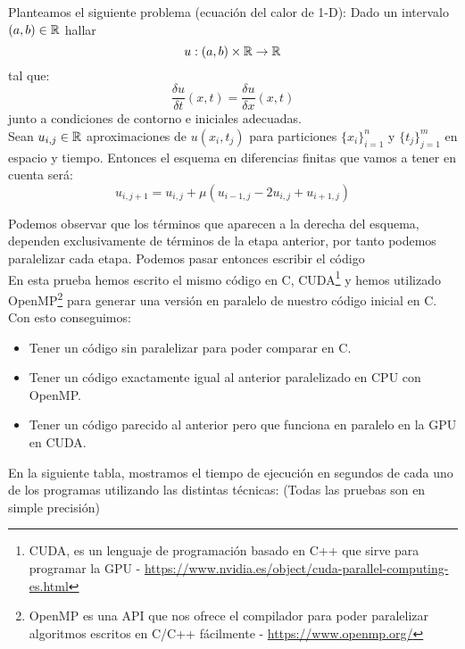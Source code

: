\begin{ejemplo}
  Planteamos el siguiente problema (ecuación del calor de 1-D): 
  Dado un intervalo $(a, b) \in \mathbb R$ hallar $$u : (a, b) \times \mathbb R \rightarrow \mathbb R$$ tal que:
  $$
	  \frac{\delta u}{\delta t} (x, t) = \frac{\delta u}{\delta x} (x, t)
  $$
  junto a condiciones de contorno e iniciales adecuadas. \\
  Sean $u_{i, j} \in \mathbb R$ aproximaciones de $u(x_i, t_j)$ para particiones $\{x_i\}^n_{i=1}$ y $\{t_j\}_{j=1}^m$ en espacio y tiempo. Entonces el esquema en diferencias finitas que vamos a tener en cuenta será:
  \[
  u_{i, j+1} = u_{i, j} + \mu (u_{i-1, j} - 2 u_{i, j} + u_{i+1, j})
  \]
  
  Podemos observar que los términos que aparecen a la derecha del esquema, dependen exclusivamente de términos de la etapa anterior, por tanto podemos paralelizar cada etapa. Podemos pasar entonces escribir el código\\
  
  En esta prueba hemos escrito el mismo código en C, CUDA\footnote{CUDA, es un lenguaje de programación basado en C++ que sirve para programar la GPU - \href{https://www.nvidia.es/object/cuda-parallel-computing-es.html}{https://www.nvidia.es/object/cuda-parallel-computing-es.html}} y hemos utilizado OpenMP\footnote{OpenMP es una API que nos ofrece el compilador para poder paralelizar algoritmos escritos en C/C++ fácilmente -  \href{https://www.openmp.org/}{https://www.openmp.org/}} para generar una versión en paralelo de nuestro código inicial en C. Con esto conseguimos:
  \begin{itemize}
  \item Tener un código sin paralelizar para poder comparar en C.
  \item Tener un código exactamente igual al anterior paralelizado en CPU con OpenMP.
  \item Tener un código parecido al anterior pero que funciona en paralelo en la GPU en CUDA.
  \end{itemize}

  En la siguiente tabla, mostramos el tiempo de ejecución en segundos de cada uno de los programas utilizando las distintas técnicas: (Todas las pruebas son en simple precisión)
  

\end{ejemplo}
